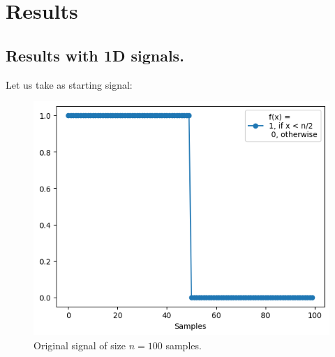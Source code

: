\documentclass[]{usiinfbachelorproject}
\begin{document}
		
		
		\section{Results}
		\subsection{Results with 1D signals.}
		Let us take as starting signal:
		\begin{figure}[h]
			\centering
			\includegraphics[width=0.4\columnwidth]{images/original_signal.png}
			\caption{Original signal of size $n=100$ samples.}
			\label{original_signal}
		\end{figure}
		
\end{document}
